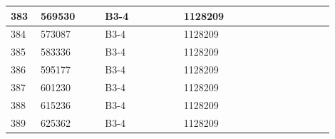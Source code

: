 \documentclass[UTF8,10pt,a4paper,fontset=fandol]{ctexart}
\newcommand{\fieldvalue}[1]{#1}
\begin{document}
\begin{center}
\begin{tabular}{|p{0.08\linewidth}|p{0.18\linewidth}|p{0.22\linewidth}|p{0.22\linewidth}|p{0.20\linewidth}|}
\fieldvalue{383} &
\fieldvalue{569530} &
\fieldvalue{B3-4} &
\fieldvalue{1128209} & \\ \hline
\fieldvalue{384} &
\fieldvalue{573087} &
\fieldvalue{B3-4} &
\fieldvalue{1128209} & \\ \hline
\fieldvalue{385} &
\fieldvalue{583336} &
\fieldvalue{B3-4} &
\fieldvalue{1128209} & \\ \hline
\fieldvalue{386} &
\fieldvalue{595177} &
\fieldvalue{B3-4} &
\fieldvalue{1128209} & \\ \hline
\fieldvalue{387} &
\fieldvalue{601230} &
\fieldvalue{B3-4} &
\fieldvalue{1128209} & \\ \hline
\fieldvalue{388} &
\fieldvalue{615236} &
\fieldvalue{B3-4} &
\fieldvalue{1128209} & \\ \hline
\fieldvalue{389} &
\fieldvalue{625362} &
\fieldvalue{B3-4} &
\fieldvalue{1128209} & \\ \hline

\end{tabular}
\end{center}
\end{document}
